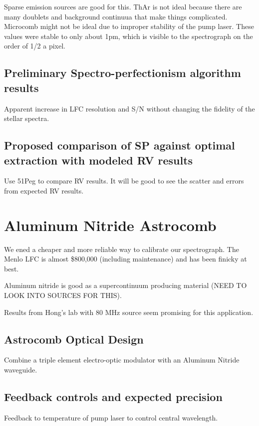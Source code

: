 \documentclass[12pt]{article}
\begin{document}
Sparse emission sources are good for this. ThAr is not ideal because there are many doublets and background continuua that make things complicated. Microcomb might not be ideal due to improper stability of the pump laser. These values were stable to only about 1pm, which is visible to the spectrograph on the order of 1/2 a pixel.

\subsection{Preliminary Spectro-perfectionism algorithm results}

Apparent increase in LFC resolution and S/N without changing the fidelity of the stellar spectra.

\subsection{Proposed comparison of SP against optimal extraction with modeled RV results}

Use 51Peg to compare RV results. It will be good to see the scatter and errors from expected RV results.

\section{Aluminum Nitride Astrocomb}
\label{sec:astrocomb}

We ened a cheaper and more reliable way to calibrate our spectrograph. The Menlo LFC is almost \$800,000 (including maintenance) and has been finicky at best.

Aluminum nitride is good as a supercontinuum producing material (NEED TO LOOK INTO SOURCES FOR THIS).

Results from Hong's lab with 80 MHz source seem promising for this application.

\subsection{Astrocomb Optical Design}

Combine a triple element electro-optic modulator with an Aluminum Nitride waveguide.

\subsection{Feedback controls and expected precision}

Feedback to temperature of pump laser to control central wavelength.
\end{document}
